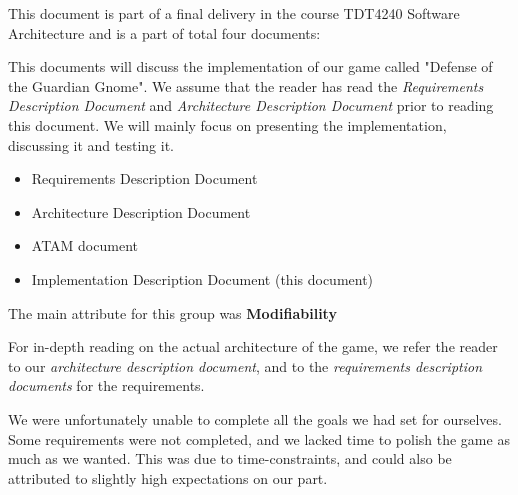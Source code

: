 This document is part of a final delivery in the course TDT4240 Software 
Architecture and is a part of total four documents:

This documents will discuss the implementation of our game called "Defense of 
the Guardian Gnome". We assume that the reader has read the \emph{Requirements 
Description Document} and \emph{Architecture Description Document} prior to 
reading this document. We will mainly focus on presenting the implementation, 
discussing it and testing it.

\begin{itemize}
	\item Requirements Description Document
	\item Architecture Description Document
	\item ATAM document
	\item Implementation Description Document (this document)
\end{itemize}

The main attribute for this group was \textbf{Modifiability}

For in-depth reading on the actual architecture of the game, we refer the
reader to our \emph{architecture description document}, and to the
\emph{requirements description documents} for the requirements. 

We were unfortunately unable to complete all the goals we had set for
ourselves. Some requirements were not completed, and we lacked time to
polish the game as much as we wanted. This was due to time-constraints,
and could also be attributed to slightly high expectations on our part.
